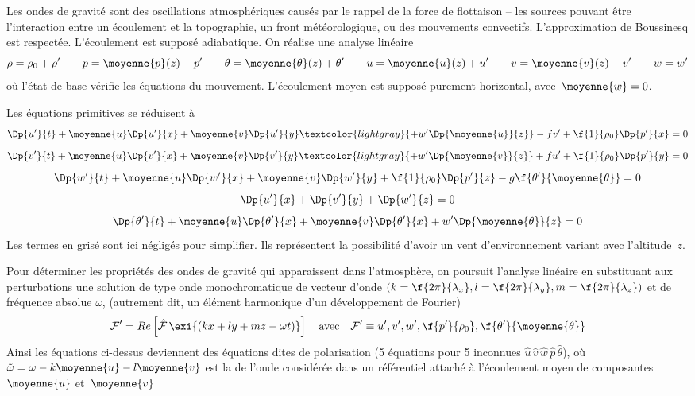 
\sk
Les ondes de gravité sont des oscillations atmosphériques
causés par le rappel de la force de flottaison
-- les sources pouvant être 
l'interaction entre un écoulement et la topographie,
un front météorologique, ou des mouvements convectifs.
L'approximation de Boussinesq est respectée.
L'écoulement est supposé adiabatique.
On réalise une analyse linéaire
\[
\rho =\rho_0 + \rho' 
\qquad
p = \moyenne{p}(z) + p' 
\qquad
\theta = \moyenne{\theta}(z) + \theta'
\qquad
u = \moyenne{u}(z) + u'
\qquad
v = \moyenne{v}(z) + v'
\qquad
w = w'
\]
\noindent où l'état de base vérifie les équations du mouvement.
L'écoulement moyen est supposé purement horizontal, avec~$\moyenne{w}=0$.

\sk
Les équations primitives se réduisent à
\[ 
\Dp{u'}{t} 
+ \moyenne{u} \Dp{u'}{x} 
+ \moyenne{v} \Dp{u'}{y} 
\textcolor{lightgray}{+ w' \Dp{\moyenne{u}}{z}}
- f v' 
+ \f{1}{\rho_0} \Dp{p'}{x}
= 0
\]
\[ 
\Dp{v'}{t} 
+ \moyenne{u} \Dp{v'}{x} 
+ \moyenne{v} \Dp{v'}{y} 
\textcolor{lightgray}{+ w' \Dp{\moyenne{v}}{z}}
+ f u' 
+ \f{1}{\rho_0} \Dp{p'}{y}
= 0
\]
\[ 
\Dp{w'}{t} 
+ \moyenne{u} \Dp{w'}{x} 
+ \moyenne{v} \Dp{w'}{y} 
+ \f{1}{\rho_0} \Dp{p'}{z}
- g \f{\theta'}{\moyenne{\theta}}
= 0
\]
\[ 
\Dp{u'}{x} 
+ \Dp{v'}{y}
+ \Dp{w'}{z}
= 0
\]
\[ 
\Dp{\theta'}{t} 
+ \moyenne{u} \Dp{\theta'}{x} 
+ \moyenne{v} \Dp{\theta'}{x} 
+ w' \Dp{\moyenne{\theta}}{z}
= 0
\]
\noindent Les termes en grisé sont ici négligés pour simplifier. 
Ils représentent la possibilité d'avoir un vent d'environnement
variant avec l'altitude~$z$.


\sk
Pour déterminer les propriétés des ondes de gravité 
qui apparaissent dans l'atmosphère,
on poursuit l'analyse linéaire en substituant
aux perturbations une solution
de type onde monochromatique 
de vecteur d'onde 
$(k=\f{2\pi}{\lambda_x},l=\f{2\pi}{\lambda_y},m=\f{2\pi}{\lambda_z})$ 
et de fréquence absolue $\omega$, 
(autrement dit, un élément harmonique d'un développement de Fourier)
\[
\mathcal{F}'
= 
Re \left[ 
\hat{\mathcal{F}} \, \exi{(kx+ly+mz-\omega t)} 
\right]
\quad \textrm{avec} \quad 
\mathcal{F}' \equiv u', v', w', \f{p'}{\rho_0}, \f{\theta'}{\moyenne{\theta}}
\]
\noindent Ainsi les équations ci-dessus deviennent 
des équations dites de polarisation 
(5 équations pour 5 inconnues $\hat{u} \, \hat{v} \, \hat{w} \, \hat{p} \, \hat{\theta}$), 
où~$\tilde{\omega} = \omega - k \moyenne{u} - l \moyenne{v}$
est la  de l'onde considérée
dans un référentiel attaché à l'écoulement moyen
de composantes $\moyenne{u}$ et~$\moyenne{v}$

